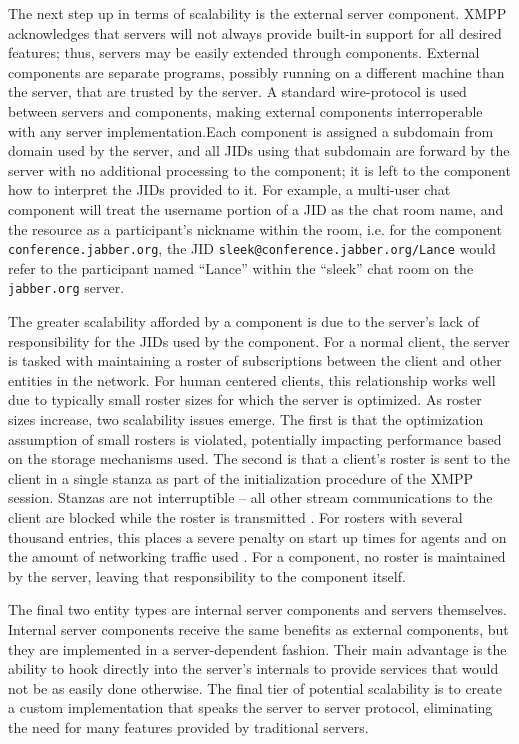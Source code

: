 The next step up in terms of scalability is the external server component.
XMPP acknowledges that servers will not always provide built-in support
for all desired features; thus, servers may be easily extended through
components. External components are separate programs, possibly running on a
different machine than the server, that are trusted by the server. A standard
wire-protocol is used between servers and components, making external components
interroperable with any server implementation.Each component is assigned a
subdomain from domain used by the server, and all JIDs using that subdomain
are forward by the server with no additional processing to the component;
it is left to the component how to interpret the JIDs provided to it. For
example, a multi-user chat component will treat the username portion of a JID
as the chat room name, and the resource as a participant's nickname within
the room, i.e. for the component \texttt{conference.jabber.org}, the JID
\texttt{sleek@conference.jabber.org/Lance} would refer to the participant named
``Lance'' within the ``sleek'' chat room on the \texttt{jabber.org} server.

The greater scalability afforded by a component is due to the server's lack
of responsibility for the JIDs used by the component. For a normal client,
the server is tasked with maintaining a roster of subscriptions between the
client and other entities in the network. For human centered clients, this
relationship works well due to typically small roster sizes for which the
server is optimized. As roster sizes increase, two scalability issues emerge.
The first is that the optimization assumption of small rosters is violated,
potentially impacting performance based on the storage mechanisms used. The
second is that a client's roster is sent to the client in a single stanza as
part of the initialization procedure of the XMPP session. Stanzas are not
interruptible -- all other stream communications to the client are blocked while
the roster is transmitted \cite{Moffitt2008a}. For rosters with several
thousand entries, this places a severe penalty on start up times for agents and
on the amount of networking traffic used \cite{Moffitt2008}. For a
component, no roster is maintained by the server, leaving that responsibility to
the component itself.

The final two entity types are internal server components and servers themselves.
Internal server components receive the same benefits as external components, but
they are implemented in a server-dependent fashion. Their main advantage is the
ability to hook directly into the server's internals to provide services that
would not be as easily done otherwise. The final tier of potential scalability
is to create a custom implementation that speaks the server to server protocol,
eliminating the need for many features provided by traditional servers.

